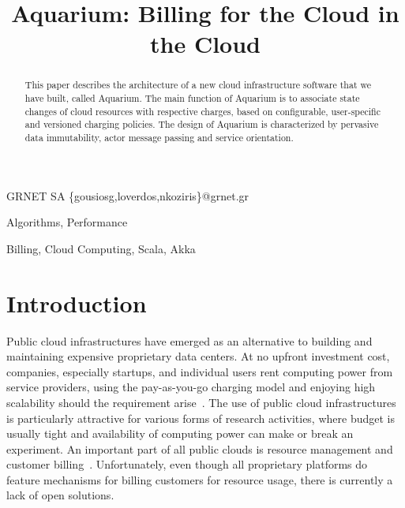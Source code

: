 \documentclass[preprint,10pt]{sigplanconf}
\begin{document}




\title{Aquarium: Billing for the Cloud in the Cloud}

{GRNET SA}
{\{gousiosg,loverdos,nkoziris\}@grnet.gr}

\maketitle
\begin{abstract}
This paper describes the architecture of a new cloud infrastructure   software that we have built, called Aquarium. The main function of Aquarium is to associate state changes of cloud resources with respective charges, based on configurable, user-specific and versioned charging policies. The design of Aquarium is characterized by pervasive data immutability, actor message passing and service orientation.
\end{abstract}


\terms
    Algorithms, Performance

\keywords
    Billing, Cloud Computing, Scala, Akka

\section{Introduction}

Public cloud infrastructures have emerged as an alternative to building and
maintaining expensive proprietary data centers. At no upfront investment cost,
companies, especially startups, and individual users rent computing power from
service providers, using the pay-as-you-go charging model and enjoying high
scalability should the requirement arise~\cite{Lourid10}. The use of public cloud
infrastructures is particularly attractive for various forms of research
activities, where budget is usually tight and availability of computing power
can make or break an experiment. An important part of all public clouds is
resource management and customer billing~\cite{Armbr10}. Unfortunately, even
though all proprietary platforms do feature mechanisms for billing customers
for resource usage, there is currently a lack of open solutions.
\end{document}
